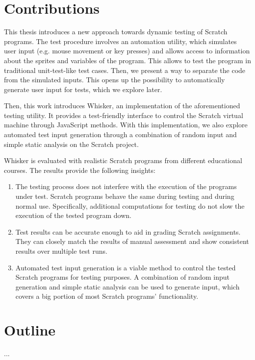 \section{Contributions}
This thesis introduces a new approach towards dynamic testing of Scratch programs.
The test procedure involves an automation utility, which simulates user input (e.g. mouse movement or key presses) and allows access to information about the sprites and variables of the program.
This allows to test the program in traditional unit-test-like test cases.
Then, we present a way to separate the code from the simulated inputs.
This opens up the possibility to automatically generate user input for tests, which we explore later.

Then, this work introduces Whisker, an implementation of the aforementioned testing utility.
It provides a test-friendly interface to control the Scratch virtual machine through JavaScript methods.
With this implementation, we also explore automated test input generation through a combination of random input and simple static analysis on the Scratch project.

Whisker is evaluated with realistic Scratch programs from different educational courses.
The results provide the following insights:

\begin{enumerate}[(1)]
    \item The testing process does not interfere with the execution of the programs under test.
        Scratch programs behave the same during testing and during normal use.
        Specifically, additional computations for testing do not slow the execution of the tested program down.
    \item Test results can be accurate enough to aid in grading Scratch assignments.
        They can closely match the results of manual assessment and show consistent results over multiple test runs.
    \item Automated test input generation is a viable method to control the tested Scratch programs for testing purposes.
        A combination of random input generation and simple static analysis can be used to generate input, which covers a big portion of most Scratch programs' functionality.
\end{enumerate}

\section{Outline}
...

%
